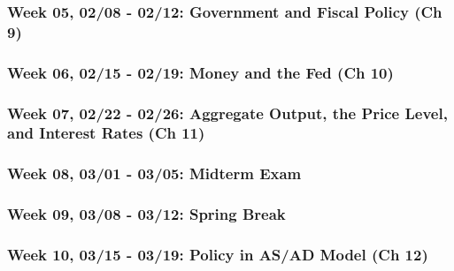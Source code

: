 \documentclass[11pt,]{article}
\begin{document}
\hypertarget{week-05-0208---0212-government-and-fiscal-policy-ch-9}{%
\subsubsection*{Week 05, 02/08 - 02/12: Government and Fiscal Policy (Ch 9)}\label{week-05-0208---0212-government-and-fiscal-policy-ch-9}}

\hypertarget{week-06-0215---0219-money-and-the-fed-ch-10}{%
\subsubsection*{Week 06, 02/15 - 02/19: Money and the Fed (Ch 10)}\label{week-06-0215---0219-money-and-the-fed-ch-10}}

\hypertarget{week-07-0222---0226-aggregate-output-the-price-level-and-interest-rates-ch-11}{%
\subsubsection*{Week 07, 02/22 - 02/26: Aggregate Output, the Price Level, and Interest Rates (Ch 11)}\label{week-07-0222---0226-aggregate-output-the-price-level-and-interest-rates-ch-11}}

\hypertarget{week-08-0301---0305-midterm-exam}{%
\subsubsection*{\texorpdfstring{Week 08, 03/01 - 03/05: \textbf{Midterm Exam}}{Week 08, 03/01 - 03/05: Midterm Exam}}\label{week-08-0301---0305-midterm-exam}}

\hypertarget{week-09-0308---0312-spring-break}{%
\subsubsection*{Week 09, 03/08 - 03/12: Spring Break}\label{week-09-0308---0312-spring-break}}

\hypertarget{week-10-0315---0319-policy-in-asad-model-ch-12}{%
\subsubsection*{Week 10, 03/15 - 03/19: Policy in AS/AD Model (Ch 12)}\label{week-10-0315---0319-policy-in-asad-model-ch-12}}
\end{document}
